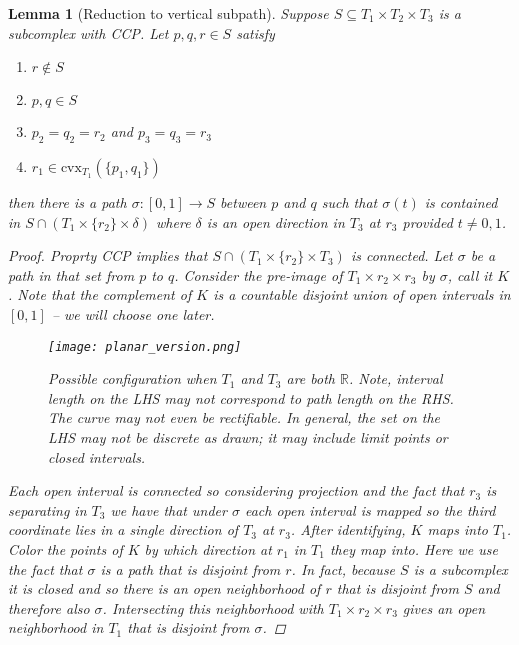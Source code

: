 \documentclass[12pt,parskip=full]{report}
\theoremstyle{plain}
\newtheorem{lem}[thm]{Lemma}
\theoremstyle{definition}
\begin{document}
\begin{lem}
    [Reduction to vertical subpath]
    \label{lem:verticalsubpath} 
    Suppose \(S \subseteq T_{1} \times T_{2} \times T_{3} \) is a subcomplex with CCP. Let \(p,q,r \in S\) satisfy
    \begin{enumerate}
        \item \(r \not\in S\) 
        \item \(p,q \in S\) 
        \item \(p_{2} = q_{2} = r_{2}\) and \(p_{3} = q_{3} =r_{3}\)
        \item \(r_1 \in \text{cvx}_{T_{1}} (\{p_1,q_1\}) \) 
    \end{enumerate}
    then there is a path \(\sigma: [0,1] \to S\) between \(p\) and \(q\) such that \(\sigma(t)\) is contained in \(S \cap (T_{1} \times \{r_{2}\} \times \delta)\) where \(\delta\) is an open direction in \(T_{3}\) at \(r_{3}\) provided \(t \neq 0,1\).

    \begin{proof}
        Proprty CCP implies that \(S \cap (T_{1} \times \{r_{2}\} \times T_{3} )\) is connected. Let \(\sigma\) be a path in that set from \(p\) to \(q\). Consider the pre-image of \(T_{1} \times r_{2} \times r_{3}\) by \(\sigma\), call it \(K\). Note that the complement of \(K\) is a countable disjoint union of open intervals in \([0,1]\) -- we will choose one later. 
        
        \begin{figure}[htp]
    \centering
    \texttt{[image: planar\_version.png]}
    \caption{Possible configuration when $T_1$ and $T_3$ are both $\mathbb{R}$. Note, interval length on the LHS may not correspond to path length on the RHS. The curve may not even be rectifiable. In general, the set on the LHS may not be discrete as drawn; it may include limit points or closed intervals.}
    \label{fig:square}
\end{figure}
        
        Each open interval is connected so considering projection and the fact that \(r_{3}\) is separating in \(T_{3}\) we have that under \(\sigma\) each open interval is mapped so the third coordinate lies in a single direction of \(T_{3}\) at \(r_{3}\). After identifying, \(K\) maps into \(T_{1}\). Color the points of \(K\) by which direction at \(r_1\) in \(T_{1}\) they map into. Here we use the fact that \(\sigma\) is a path that is disjoint from \(r\). In fact, because \(S\) is a subcomplex it is closed and so there is an open neighborhood of \(r\) that is disjoint from \(S\) and therefore also  \(\sigma\). Intersecting this neighborhood with \(T_{1} \times r_{2} \times r_{3}\) gives an open neighborhood in \(T_{1}\) that is disjoint from \(\sigma\). 


\end{proof}
\end{lem}
\end{document}
